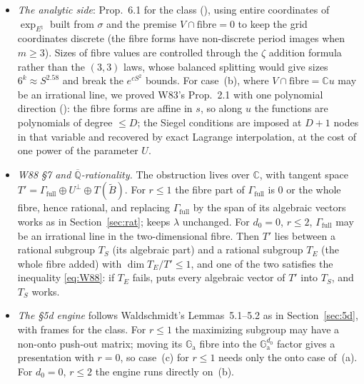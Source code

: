 \documentclass[11pt]{amsart}
\theoremstyle{definition}
\theoremstyle{remark}
\numberwithin{equation}{section}
\newcommand{\CC}{\mathbb{C}}
\newcommand{\Qbar}{\overline{\mathbb{Q}}}
\newcommand{\Ga}{\mathbb{G}_{\mathrm{a}}}
\begin{document}
\begin{itemize}
\item \emph{The analytic side}: Prop.~6.1 for the class (), using entire
coordinates of $\exp_{E^\natural}$ built from $\sigma$ and the premise $V\cap\text{fibre}=0$ to keep the grid
coordinates discrete (the fibre forms have non-discrete period images when $m\ge3$). Sizes of fibre values
are controlled through the $\zeta$ addition formula rather than the $(3,3)$ laws, whose balanced splitting would
give sizes $6^k\approx S^{2.58}$ and break the $e^{cS^2}$ bounds. For case~(b), where $V\cap\text{fibre}=\CC u$
may be an irrational line, we proved W83's Prop.~2.1 with one polynomial direction (): the
fibre forms are affine in $s$, so along $u$ the functions are polynomials of degree $\le D$; the Siegel
conditions are imposed at $D+1$ nodes in that variable and recovered by exact Lagrange interpolation, at the
cost of one power of the parameter $U$.
\item \emph{W88 \S7 and $\Qbar$-rationality.} The obstruction lives over $\CC$, with tangent space
$T'=\Gamma_{\mathrm{full}}\oplus U^\perp\oplus T(\tilde B)$. For $r\le1$ the fibre part of $\Gamma_{\mathrm{full}}$ is $0$ or the
whole fibre, hence rational, and replacing $\Gamma_{\mathrm{full}}$ by the span of its algebraic vectors works as in
Section~\ref{sec:rat};  keeps $\lambda$ unchanged. For $d_0=0$, $r\le2$, $\Gamma_{\mathrm{full}}$ may be an
irrational line in the two-dimensional fibre. Then $T'$ lies between a rational subgroup $T_S$ (its algebraic
part) and a rational subgroup $T_E$ (the whole fibre added) with $\dim T_E/T'\le1$, and one of the two
satisfies the inequality \eqref{eq:W88}: if $T_E$ fails,  puts every algebraic vector of
$T'$ into $T_S$, and $T_S$ works.
\item \emph{The \S5d engine} follows Waldschmidt's Lemmas~5.1--5.2 as in Section~\ref{sec:5d}, with frames
for the class. For $r\le1$ the maximizing subgroup may have a non-onto push-out matrix; moving its $\Ga$ fibre
into the $\Ga^{d_0}$ factor gives a presentation with $r=0$, so case~(c) for $r\le1$ needs only the onto
case of~(a). For $d_0=0$, $r\le2$ the engine runs directly on~(b).
\end{itemize}
\end{document}
